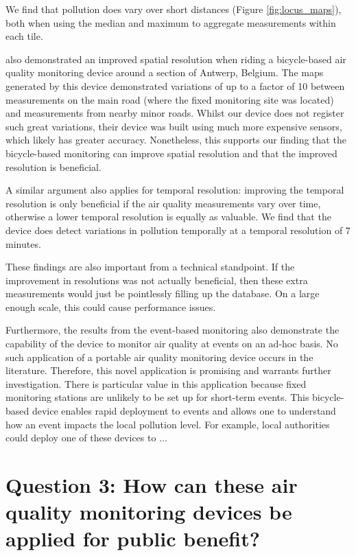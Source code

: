 \documentclass[11pt,twosided,a4paper]{report}
\begin{document}
We find that pollution does vary over short distances (Figure \ref{fig:locus_maps}), both when using the median and maximum to aggregate measurements within each tile.

\cite{Elen2013aeroflex} also demonstrated an improved spatial resolution when riding a bicycle-based air quality monitoring device around a section of Antwerp, Belgium. The maps generated by this device demonstrated variations of up to a factor of 10 between measurements on the main road (where the fixed monitoring site was located) and measurements from nearby minor roads. Whilst our device does not register such great variations, their device was built using much more expensive sensors, which likely has greater accuracy. Nonetheless, this supports our finding that the bicycle-based monitoring can improve spatial resolution and that the improved resolution is beneficial.

A similar argument also applies for temporal resolution: improving the temporal resolution is only beneficial if the air quality measurements vary over time, otherwise a lower temporal resolution is equally as valuable. We find that the device does detect variations in pollution temporally at a temporal resolution of 7 minutes.

These findings are also important from a technical standpoint. If the improvement in resolutions was not actually beneficial, then these extra measurements would just be pointlessly filling up the database. On a large enough scale, this could cause performance issues.

Furthermore, the results from the event-based monitoring also demonstrate the capability of the device to monitor air quality at events on an ad-hoc basis. No such application of a portable air quality monitoring device occurs in the literature. Therefore, this novel application is promising and warrants further investigation. There is particular value in this application because fixed monitoring stations are unlikely to be set up for short-term events. This bicycle-based device enables rapid deployment to events and allows one to understand how an event impacts the local pollution level. For example, local authorities could deploy one of these devices to ...


\chapter[Public benefit application]{Question 3: How can these air quality monitoring devices be applied for public benefit?} \label{chap:q3}
\end{document}
